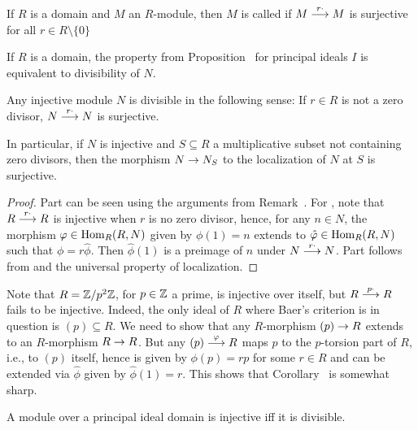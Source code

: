 \documentclass[a4paper,parskip=half,numbers=enddot, DIV=12]{scrreprt}
\begin{document}
\begin{defi}
	If $R$ is a domain and $M$ an $R$-module, then $M$ is called  if $M\morphism[r\cdot]M$ is surjective for all $r\in R\setminus\{0\}$
\end{defi}
\begin{cor}
	\begin{alphanumerate}
		\item {}If $R$ is a domain, the property from Proposition~ for principal ideals $I$ is equivalent to divisibility of $N$.
		\item Any injective module $N$ is divisible in the following sense: If $r\in R$ is not a zero divisor, $N\morphism[r\cdot]N$ is surjective.
		\item In particular, if $N$ is injective and $S\subseteq R$ a multiplicative subset not containing zero divisors, then the morphism $N\morphism N_S$ to the localization of $N$ at $S$ is surjective.
	\end{alphanumerate}
\end{cor}
\begin{proof}
	Part  can be seen using the arguments from Remark~. For , note that $R\morphism[r\cdot]R$ is injective when $r$ is no zero divisor, hence, for any $n\in N$, the morphism $\varphi\in\operatorname{Hom}_R(R,N)$ given by $\phi(1)=n$ extends to $\hat{\varphi}\in\operatorname{Hom}_R(R,N)$ such that $\phi=r\hat{\phi}$. Then $\hat{\phi}(1)$ is a preimage of $n$ under $N\morphism[r\cdot]N$. Part  follows from  and the universal property of localization.
\end{proof}
\begin{rem*}
	Note that $R=\mathbb{Z}/p^2\mathbb{Z}$, for $p\in\mathbb{Z}$ a prime, is injective over itself, but $R\morphism[p\cdot ]R$ fails to be injective. Indeed, the only ideal of $R$ where Baer's criterion is in question is $(p)\subseteq R$. We need to show that any $R$-morphism $(p)\morphism R$ extends to an $R$-morphism $R\morphism R$. But any $(p)\morphism[\phi] R$ maps $p$ to the $p$-torsion part of $R$, i.e., to $(p)$ itself, hence is given by $\phi(p)=rp$ for some $r\in R$ and can be extended via $\hat{\phi}$ given by $\hat{\phi}(1)=r$. This shows that Corollary~ is somewhat sharp.
\end{rem*}
\begin{cor}
	A module over a principal ideal domain is injective iff it is divisible.
\end{cor}
\end{document}
